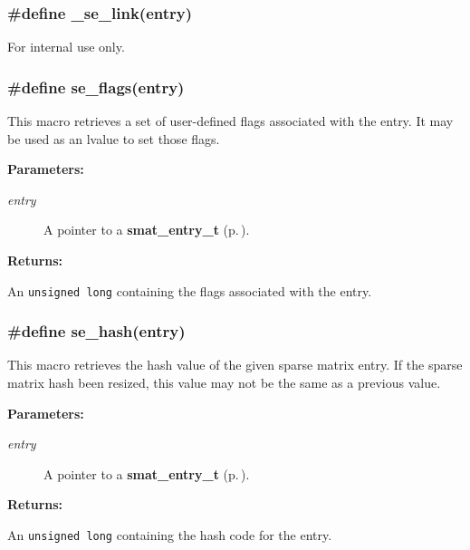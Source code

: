 \subsubsection{\setlength{\rightskip}{0pt plus 5cm}\#define \_\-se\_\-link(entry)}\label{group__dbprim__smat_a41}




For internal use only.
\subsubsection{\setlength{\rightskip}{0pt plus 5cm}\#define se\_\-flags(entry)}\label{group__dbprim__smat_a42}




 This macro retrieves a set of user-defined flags associated with the entry. It may be used as an lvalue to set those flags.\begin{Desc}
\item[{\bf Parameters: }]\par
\begin{description}
\item[
{\em entry}]A pointer to a {\bf smat\_\-entry\_\-t} {\rm (p.\,\pageref{group__dbprim__smat_a2})}.

\end{description}
\end{Desc}
\begin{Desc}
\item[{\bf Returns: }]\par
An {\tt unsigned long} containing the flags associated with the entry. \end{Desc}
\subsubsection{\setlength{\rightskip}{0pt plus 5cm}\#define se\_\-hash(entry)}\label{group__dbprim__smat_a43}




 This macro retrieves the hash value of the given sparse matrix entry. If the sparse matrix hash been resized, this value may not be the same as a previous value.\begin{Desc}
\item[{\bf Parameters: }]\par
\begin{description}
\item[
{\em entry}]A pointer to a {\bf smat\_\-entry\_\-t} {\rm (p.\,\pageref{group__dbprim__smat_a2})}.

\end{description}
\end{Desc}
\begin{Desc}
\item[{\bf Returns: }]\par
An {\tt unsigned long} containing the hash code for the entry. \end{Desc}
